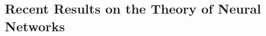 %
%
%


%
%






\subsection{Recent Results on the Theory of Neural Networks}
\label{subsection:ch2-recent_results_on_the_theory_of_neural_networks}


